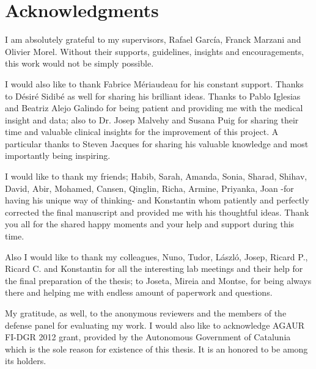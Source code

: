 \cleardoublepage

\printacronyms[name = Abbreviations]

\listoffigures
\cleardoublepage
{}
\listoftables
\cleardoublepage


\newpage
\thispagestyle{empty}
\chapter*{Acknowledgments}	
\singlespacing
I am absolutely grateful to my supervisors, Rafael Garc\'ia, Franck Marzani and Olivier Morel.	
Without their supports, guidelines, insights and encouragements, this work would not be simply possible. 

I would also like to thank Fabrice M\'eriaudeau for his constant support.
Thanks to D\'esir\'e Sidib\'e as well for sharing his brilliant ideas. 
Thanks to Pablo Iglesias and Beatriz Alejo Galindo for being patient and providing me with the medical insight and data; also to Dr. Josep Malvehy and Susana Puig for sharing their time and valuable clinical insights for the improvement of this project.
A particular thanks to Steven Jacques for sharing his valuable knowledge and most importantly being inspiring.

I would like to thank my friends; Habib, Sarah, Amanda, Sonia, Sharad, Shihav, David, Abir, Mohamed, Cansen, Qinglin, Richa, Armine, Priyanka, Joan -for having his unique way of thinking- and Konstantin whom patiently and perfectly corrected the final manuscript and provided me with his thoughtful ideas. 
Thank you all for the shared happy moments and your help and support during this time.

Also I would like to thank my colleagues, Nuno, Tudor, L\'aszl\'o, Josep, Ricard P., Ricard C. and Konstantin for all the interesting lab meetings and their help for the final preparation of the thesis; to Joseta, Mireia and Montse, for being always there and helping me with endless amount of paperwork and questions.

My gratitude, as well, to the anonymous reviewers and the members of the defense panel for evaluating my work.
I would also like to acknowledge AGAUR FI-DGR 2012 grant, provided by the Autonomous Government of Catalunia which is the sole reason for existence of this thesis.
It is an honored to be among its holders. 


